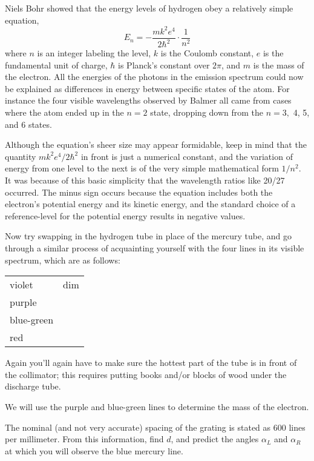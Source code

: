 Niels Bohr showed that the energy levels of hydrogen obey a relatively simple equation,\label{bohr-equation}
\begin{equation*}
	E_n = -\frac{mk^2e^4}{2\hbar^2}\cdot\frac{1}{n^2}
\end{equation*}
where $n$ is an integer labeling the level, $k$ is the
Coulomb constant, $e$ is the fundamental unit of charge, $\hbar$
is Planck's constant over $2\pi$, and $m$ is the mass of the electron.
All the energies of the photons in the emission spectrum
could now be explained as differences in energy between
specific states of the atom. For instance the four visible
wavelengths observed by Balmer all came from cases where the
atom ended up in the $n=2$ state, dropping down from the
$n=3,$ 4, 5, and 6 states.

Although the equation's sheer size may appear for\-mid\-ab\-le,
keep in mind that the quantity $mk^2e^4/2\hbar^2$ in front is just a
numerical constant, and the variation of energy from one
level to the next is of the very simple mathematical form
$1/n^2$. It was because of this basic simplicity that the
wavelength ratios like 20/27 occurred. The minus sign occurs
because the equation includes both the electron's potential
energy and its kinetic energy, and the standard choice of a
reference-level for the potential energy results in negative values. 

Now try swapping in the hydrogen tube in place of the mercury tube, and go through
a similar process of acquainting yourself with the four lines in its visible spectrum, which are as
follows:

\begin{tabular}{lp{50mm}}
  violet & dim \\
  purple & \\
  blue-green & \\
  red
\end{tabular}

Again you'll again have to make
sure the hottest part of the tube is in front of the
collimator; this requires putting
books and/or blocks of wood under the discharge tube.

We will use the purple and blue-green lines to determine the mass of the electron.

\prelab

\prelabquestion  
The nominal (and not very accurate) spacing of the grating is stated
as 600 lines per millimeter. From this information, find $d$, and
predict the angles $\alpha_L$ and $\alpha_R$ at which you will observe the blue mercury line.

